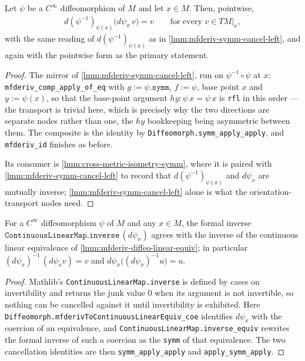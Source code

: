 \begin{lemma}
    \label{lmm:mfderiv-symm-cancel-right}
    \leanok
    Let $\psi$ be a $C^\infty$ diffeomorphism of $M$ and let $x \in M$. Then, pointwise,
    \begin{align}
        d(\psi^{-1})_{\psi(x)}\big(d\psi_x\,v\big) = v \qquad \text{for every } v \in TM|_x,
    \end{align}
    with the same reading of $d(\psi^{-1})_{\psi(x)}$ as in \ref{lmm:mfderiv-symm-cancel-left}, and again with the pointwise form as the primary statement.
\end{lemma}
\begin{proof}
    \leanok
    The mirror of \ref{lmm:mfderiv-symm-cancel-left}, run on $\psi^{-1} \circ \psi$ at $x$: \texttt{mfderiv\_comp\_apply\_of\_eq} with $g := \psi.\mathtt{symm}$, $f := \psi$, base point $x$ and $y := \psi(x)$, so that the base-point argument $hy : \psi\,x = \psi\,x$ is \texttt{rfl} in this order --- the transport is trivial here, which is precisely why the two directions are separate nodes rather than one, the $hy$ bookkeeping being asymmetric between them. The composite is the identity by \texttt{Diffeomorph.symm\_apply\_apply}, and \texttt{mfderiv\_id} finishes as before.

    Its consumer is \ref{lmm:cross-metric-isometry-symm}, where it is paired with \ref{lmm:mfderiv-symm-cancel-left} to record that $d(\psi^{-1})_{\psi(x)}$ and $d\psi_x$ are mutually inverse; \ref{lmm:mfderiv-symm-cancel-left} alone is what the orientation-transport nodes need.
\end{proof}

\begin{lemma}
    \label{lmm:mfderiv-inverse-eq-symm}
    \leanok
    For a $C^\infty$ diffeomorphism $\psi$ of $M$ and any $x \in M$, the formal inverse $\mathtt{ContinuousLinearMap.inverse}\,(d\psi_x)$ agrees with the inverse of the continuous linear equivalence of \ref{lmm:mfderiv-diffeo-linear-equiv}; in particular $(d\psi_x)^{-1}\,(d\psi_x v) = v$ and $d\psi_x\big((d\psi_x)^{-1}u\big) = u$.
\end{lemma}
\begin{proof}
    \leanok
    Mathlib's \texttt{ContinuousLinearMap.inverse} is defined by cases on invertibility and returns the junk value $0$ when its argument is not invertible, so nothing can be cancelled against it until invertibility is exhibited. Here \texttt{Diffeomorph.mfderivToContinuousLinearEquiv\_coe} identifies $d\psi_x$ with the coercion of an equivalence, and \texttt{ContinuousLinearMap.inverse\_equiv} rewrites the formal inverse of such a coercion as the \texttt{symm} of that equivalence. The two cancellation identities are then \texttt{symm\_apply\_apply} and \texttt{apply\_symm\_apply}.
\end{proof}


